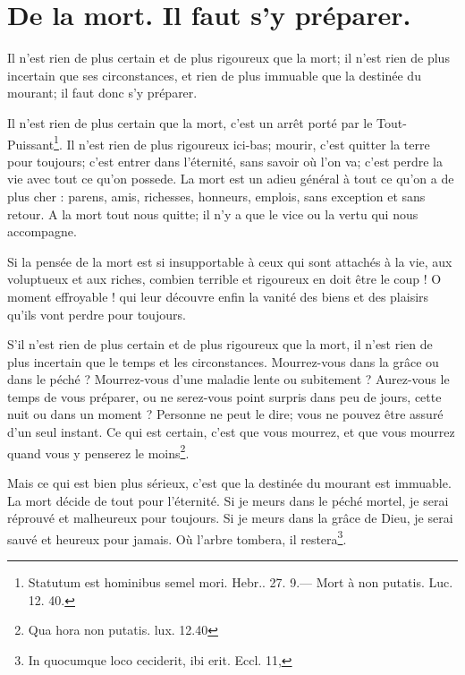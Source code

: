\documentclass[instructions.tex]{subfiles}
\begin{document}
 
\chapter{De la mort. Il faut s’y préparer.}
 
\primo Il n’est rien de plus certain et de plus rigoureux que la mort; il n’est rien de plus incertain que ses circonstances, et rien de plus immuable que la destinée du mourant; il faut donc s’y préparer.
 
Il n’est rien de plus certain que la mort, c’est un arrêt porté par le Tout-Puissant\footnote{Statutum est hominibus semel mori. Hebr.. 27. 9.— Mort à non putatis. Luc. 12. 40.}. Il n’est rien de plus rigoureux ici-bas; mourir, c’est quitter la terre pour toujours; c’est entrer dans l’éternité, sans savoir où l’on va; c’est perdre la vie avec tout ce qu’on possede. La mort est un adieu général à tout ce qu’on a de plus cher : parens, amis, richesses, honneurs, emplois, sans exception et sans retour. A la mort tout nous quitte; il n’y a que le vice ou la vertu qui nous accompagne.
 
Si la pensée de la mort est si insupportable à ceux qui sont attachés à la vie, aux voluptueux et aux riches, combien terrible et rigoureux en doit être le coup ! O moment effroyable ! qui leur découvre enfin la vanité des biens et des plaisirs qu’ils vont perdre pour toujours.
 
S’il n’est rien de plus certain et de plus rigoureux que la mort, il n’est rien de plus incertain que le temps et les circonstances. Mourrez-vous dans la grâce ou dans le péché ? Mourrez-vous d’une maladie lente ou subitement ? Aurez-vous le temps de vous préparer, ou ne serez-vous point surpris dans peu de jours, cette nuit ou dans un moment ? Personne ne peut le dire; vous ne pouvez être assuré d’un seul instant. Ce qui est certain, c’est que vous mourrez, et que vous mourrez quand vous y penserez le moins\footnote{Qua hora non putatis. lux. 12.40}.
 
Mais ce qui est bien plus sérieux, c’est que la destinée du mourant est immuable. La mort décide de tout pour l’éternité. Si je meurs dans le péché mortel, je serai réprouvé et malheureux pour toujours. Si je meurs dans la grâce de Dieu, je serai sauvé et heureux pour jamais. Où l’arbre tombera, il restera\footnote{In quocumque loco ceciderit, ibi erit. Eccl. 11,}.
 
\end{document}
